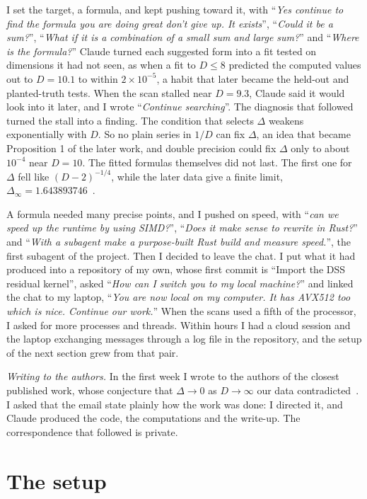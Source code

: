 \documentclass[aps,prd,onecolumn,superscriptaddress,nofootinbib,10pt]{revtex4-2}
\newcommand{\prompt}[1]{``\textit{#1}''}
\begin{document}
I set the target, a formula, and kept pushing toward it, with \prompt{Yes continue to find the formula you are doing
great don't give up. It exists}, \prompt{Could it be a sum?}, \prompt{What if it is a combination of a small sum and
large sum?} and \prompt{Where is the formula?} Claude turned each suggested form into a fit tested on dimensions it had
not seen, as when a fit to $D \le 8$ predicted the computed values out to $D = 10.1$ to within $2\times10^{-5}$, a habit
that later became the held-out and planted-truth tests. When the scan stalled near $D = 9.3$, Claude said it would look
into it later, and I wrote \prompt{Continue searching}. The diagnosis that followed turned the stall into a finding. The
condition that selects $\Delta$ weakens exponentially with $D$. So no plain series in $1/D$ can fix $\Delta$, an idea
that became Proposition 1 of the later work, and double precision could fix $\Delta$ only to about $10^{-4}$ near $D =
10$. The fitted formulas themselves did not last. The first one for $\Delta$ fell like $(D-2)^{-1/4}$, while the later
data give a finite limit, $\Delta_\infty = 1.643893746$~\cite{physics}.

A formula needed many precise points, and I pushed on speed, with \prompt{can we speed up the runtime by using SIMD?},
\prompt{Does it make sense to rewrite in Rust?} and \prompt{With a subagent make a purpose-built Rust build and measure
speed.}, the first subagent of the project. Then I decided to leave the chat. I put what it had produced into a repository
of my own, whose first commit is ``Import the DSS residual kernel'', asked \prompt{How can I switch you to my local
machine?} and linked the chat to my laptop, \prompt{You are now local on my computer. It has AVX512 too which is nice.
Continue our work.} When the scans used a fifth of the processor, I asked for more processes and threads. Within hours I
had a cloud session and the laptop exchanging messages through a log file in the repository, and the setup of the next section grew from
that pair.

\emph{Writing to the authors.} In the first week I wrote to the authors of the closest published work, whose
conjecture that $\Delta \to 0$ as $D \to \infty$ our data contradicted~\cite{EckerEtAl2026,EckerEG2026}. I asked that
the email state plainly how the work was done: I directed it, and Claude produced the code, the computations and the
write-up. The correspondence that followed is private.

\section{The setup}
\label{sec:setup}
\end{document}
